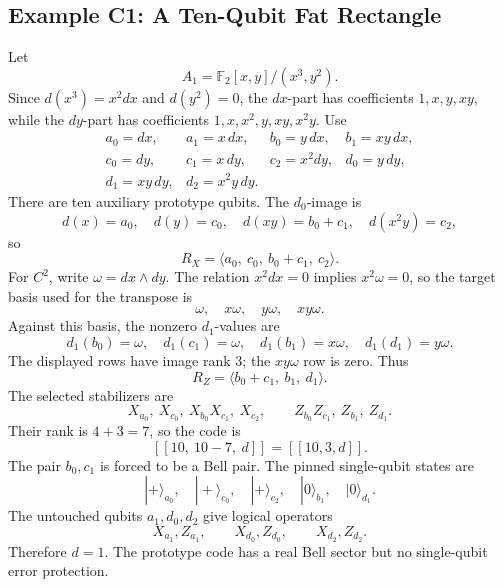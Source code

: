 \subsection{Example C1: A Ten-Qubit Fat Rectangle}
Let
\[
  A_1=\mathbb F_2[x,y]/(x^3,y^2).
\]
Since \(d(x^3)=x^2dx\) and \(d(y^2)=0\), the \(dx\)-part has coefficients
\(1,x,y,xy\), while the \(dy\)-part has coefficients
\(1,x,x^2,y,xy,x^2y\).  Use
\[
\begin{array}{llll}
a_0=dx,&a_1=x\,dx,&b_0=y\,dx,&b_1=xy\,dx,\\
c_0=dy,&c_1=x\,dy,&c_2=x^2dy,&d_0=y\,dy,\\
d_1=xy\,dy,&d_2=x^2y\,dy.&
\end{array}
\]
There are ten auxiliary prototype qubits.  The \(d_0\)-image is
\[
  d(x)=a_0,\quad d(y)=c_0,\quad
  d(xy)=b_0+c_1,\quad d(x^2y)=c_2,
\]
so
\[
  R_X=\langle a_0,\ c_0,\ b_0+c_1,\ c_2\rangle.
\]
For \(C^2\), write \(\omega=dx\wedge dy\).  The relation \(x^2dx=0\)
implies \(x^2\omega=0\), so the target basis used for the transpose is
\[
  \omega,\quad x\omega,\quad y\omega,\quad xy\omega.
\]
Against this basis, the nonzero \(d_1\)-values are
\[
  d_1(b_0)=\omega,\quad d_1(c_1)=\omega,\quad
  d_1(b_1)=x\omega,\quad d_1(d_1)=y\omega.
\]
The displayed rows have image rank \(3\); the \(xy\omega\) row is zero.
Thus
\[
  R_Z=\langle b_0+c_1,\ b_1,\ d_1\rangle.
\]
The selected stabilizers are
\[
  X_{a_0},\ X_{c_0},\ X_{b_0}X_{c_1},\ X_{c_2},\qquad
  Z_{b_0}Z_{c_1},\ Z_{b_1},\ Z_{d_1}.
\]
Their rank is \(4+3=7\), so the code is
\[
  [[10,\ 10-7,\ d]]=[[10,3,d]].
\]
The pair \(b_0,c_1\) is forced to be a Bell pair.  The pinned single-qubit
states are
\[
  |+\rangle_{a_0},\quad |+\rangle_{c_0},\quad |+\rangle_{c_2},\quad
  |0\rangle_{b_1},\quad |0\rangle_{d_1}.
\]
The untouched qubits \(a_1,d_0,d_2\) give logical operators
\[
  X_{a_1},Z_{a_1},\qquad X_{d_0},Z_{d_0},\qquad X_{d_2},Z_{d_2}.
\]
Therefore \(d=1\).  The prototype code has a real Bell sector but no
single-qubit error protection.
